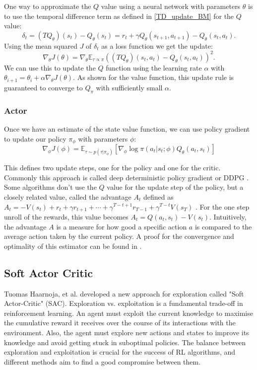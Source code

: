 One way to approximate the $Q$ value using a neural network with parameters $\theta$ is to use the temporal difference term as defined in \ref{TD_update_BM} for the $Q$ value:
\begin{equation}
    \label{Q-ValueTD}
    \delta_t = (T Q_{\theta})(s_t) - Q_{\theta}(s_t) = r_t + \gamma Q_{\theta}(s_{t+1}, a_{t+1}) - Q_{\theta}(s_{t}, a_{t}).
\end{equation}
Using the mean squared $J$ of $\delta_t$ as a loss function we get the update:
\begin{equation}
    \nabla_{\theta} J(\theta) = \nabla_{\theta} \mathbb{E}_{\tau \propto \pi}((T Q_{\theta})(s_t, a_t) - Q_{\theta}(s_t, a_t))^2.
\end{equation}
We can use this to update the $Q$ function using the learning rate $\alpha$ with $\theta_{i+1} = \theta_i + \alpha \nabla_{\theta} J(\theta)$. As shown for the value 
function, this update rule is guaranteed to converge to $Q_{\pi}$ with sufficiently small $\alpha$.

\subsubsection{Actor}
Once we have an estimate of the state value function, we can use policy gradient to update our policy $\pi_{\phi}$ with parameters $\phi$:
\begin{equation}
    \label{AC_general_update}
    \nabla_{\phi} J(\phi) = \mathbb{E}_{\tau \sim p(\tau | \pi_{\phi})} \left[\nabla_{\phi} \log \pi(a_t|s_t;\phi) Q_{\theta}(a_t, s_t) \right]
\end{equation}

This defines two update steps, one for the policy and one for the critic. Commonly this approach is called deep deterministic policy gradient or DDPG \cite{lillicrap2019continuous}. 
Some algorithms don't use the $Q$ value for the update step of the policy, but a closely 
related value, called the advantage $A_t$ defined as $A_t = -V(s_t) + r_t + \gamma r_{t+1} + \cdots + \gamma^{T-t+1} r_{T-1} + \gamma^{T-t} V(s_T)$ \cite{A2C}. For the one step 
unroll of the rewards, this value becomes $A_t = Q(a_t, s_t) - V(s_t)$. 
Intuitively, the advantage $A$ is a measure for how good a specific action $a$ is compared to the average action taken by the current policy. 
A proof for the convergence and optimality of this estimator can be found in \cite{proof_A}.

\subsection{Soft Actor Critic}
\label{SAC}
Tuomas Haarnoja, et al. \cite{haarnoja2018soft} developed a new approach for exploration called "Soft Actor-Critic" (SAC). Exploration vs. exploitation 
is a fundamental trade-off in reinforcement learning. An agent must exploit the current knowledge to maximise the cumulative reward it receives 
over the course of its interactions with the environment. Also, the agent must explore new actions and states to improve its knowledge and avoid getting stuck in suboptimal policies. 
The balance between exploration and exploitation is crucial for the success of RL algorithms, and different methods aim to find a good compromise between them.

